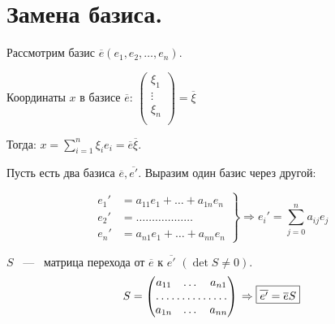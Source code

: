 


%
	
	
	\section{Замена базиса.}
	Рассмотрим базис $\overline{e}(e_1,e_2,\dots,e_n)$.
	
	Координаты $x$ в базисе $\overline{e}$: $ \begin{pmatrix}
	\xi_1\\  
	\vdots\\
	\xi_n\\
	\end{pmatrix} = \overline{\xi}$
	
	\vspace{0.25cm}
	Тогда: $x  = \sum\limits_{i=1}^n \xi_ie_i = \overline{e}\overline{\xi}$.
	\vspace{5mm}
	
	Пусть есть два базиса $\overline{e}, \overline{e'}$. Выразим один базис через другой:
	
	\begin{equation*}
	\left.
	\begin{aligned}
	e_1' &= a_{11}e_1 + \dots+ a_{1n}e_n\\
	e_2' &= \dots\dots\dots\dots\dots\dots\\
	e_n' &= a_{n1}e_1 + \dots  + a_{nn}e_n
	\end{aligned} 
	\right\} \Rightarrow e_i' = \sum\limits_{j=0}^n a_{ij}e_j \end{equation*}
	
	
	\vspace{3mm}
	
	$S$ ~---~ \textsf{матрица перехода} от $\overline{e}$ к $\overline{e'}$ $(\det S\neq 0).$
	\begin{equation*}
	\left.
	\begin{aligned}S = \begin{pmatrix}
	a_{11} & \dots & a_{n1}\\
	\hdotsfor{3}\\
	a_{1n} & \dots & a_{nn}\\
	\end{pmatrix}
	\end{aligned} 
	\right. \Rightarrow \boxed{\overline{e'} = \overline{e}S}
	\end{equation*}
	\vspace{3mm}
	
